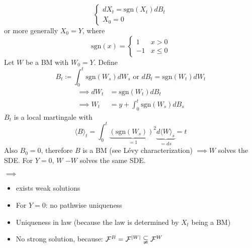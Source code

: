 \begin{example}
    \begin{equation}
        \begin{cases}
            dX_t=\text{sgn}(X_t)dB_t\\
            X_0=0
        \end{cases}
    \end{equation} or more generally $X_0=Y$, where 
    \begin{equation*}
        \text{sgn}(x)=\begin{cases}
            1& x>0\\-1 &x\leq 0
        \end{cases}
    \end{equation*}
    Let $W$ be a BM with $W_0=Y$. Define 
    \[B_t\coloneqq \int_0^t\text{sgn}(W_s)dW_s\text{ or } dB_t=\text{sgn}(W_t)dW_t\]
    \begin{align*}
        \implies dW_t &= \text{sgn}(W_t)dB_t \\
        \implies W_t&=y+\int_0^t \text{sgn}(W_s)dB_s
    \end{align*}
    $B_t$ is a local martingale with 
    \[\langle B\rangle_t=\int_0^t \underbrace{(\text{sgn}(W_s))^2}_{=1} \underbrace{d\langle W\rangle_s}_{=ds}=t\]
    Also $B_0=0$, therefore $B$ is a BM (see Lévy characterization) $\implies W$ solves the SDE.
    For $Y=0$, $W$  $-W$ solves the same SDE.

    $\implies$
    \begin{itemize}
        \item  exists weak solutions
        \item For $Y=0$: no pathwise uniqueness
        \item Uniqueness in law (because the law is determined by $X_t$ being a BM)
        \item No strong solution, because: $\mathcal{F}^B=\mathcal{F}^{|W|}\subsetneqq \mathcal{F}^{W}$ 
    \end{itemize}
\end{example}

